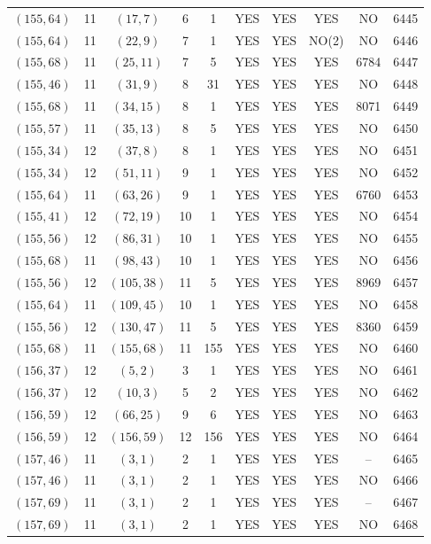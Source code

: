 \begin{longtable}{|c|c|c|c|c|c|c|c|c|c|}
$(155, 64)$ & 11 & $(17, 7)$ & 6 & 1 & YES & YES & YES & NO & 6445\\
$(155, 64)$ & 11 & $(22, 9)$ & 7 & 1 & YES & YES & NO(2) & NO & 6446\\
$(155, 68)$ & 11 & $(25, 11)$ & 7 & 5 & YES & YES & YES & 6784 & 6447\\
$(155, 46)$ & 11 & $(31, 9)$ & 8 & 31 & YES & YES & YES & NO & 6448\\
$(155, 68)$ & 11 & $(34, 15)$ & 8 & 1 & YES & YES & YES & 8071 & 6449\\
$(155, 57)$ & 11 & $(35, 13)$ & 8 & 5 & YES & YES & YES & NO & 6450\\
$(155, 34)$ & 12 & $(37, 8)$ & 8 & 1 & YES & YES & YES & NO & 6451\\
$(155, 34)$ & 12 & $(51, 11)$ & 9 & 1 & YES & YES & YES & NO & 6452\\
$(155, 64)$ & 11 & $(63, 26)$ & 9 & 1 & YES & YES & YES & 6760 & 6453\\
$(155, 41)$ & 12 & $(72, 19)$ & 10 & 1 & YES & YES & YES & NO & 6454\\
$(155, 56)$ & 12 & $(86, 31)$ & 10 & 1 & YES & YES & YES & NO & 6455\\
$(155, 68)$ & 11 & $(98, 43)$ & 10 & 1 & YES & YES & YES & NO & 6456\\
$(155, 56)$ & 12 & $(105, 38)$ & 11 & 5 & YES & YES & YES & 8969 & 6457\\
$(155, 64)$ & 11 & $(109, 45)$ & 10 & 1 & YES & YES & YES & NO & 6458\\
$(155, 56)$ & 12 & $(130, 47)$ & 11 & 5 & YES & YES & YES & 8360 & 6459\\
$(155, 68)$ & 11 & $(155, 68)$ & 11 & 155 & YES & YES & YES & NO & 6460\\
$(156, 37)$ & 12 & $(5, 2)$ & 3 & 1 & YES & YES & YES & NO & 6461\\
$(156, 37)$ & 12 & $(10, 3)$ & 5 & 2 & YES & YES & YES & NO & 6462\\
$(156, 59)$ & 12 & $(66, 25)$ & 9 & 6 & YES & YES & YES & NO & 6463\\
$(156, 59)$ & 12 & $(156, 59)$ & 12 & 156 & YES & YES & YES & NO & 6464\\
$(157, 46)$ & 11 & $(3, 1)$ & 2 & 1 & YES & YES & YES & -- & 6465\\
$(157, 46)$ & 11 & $(3, 1)$ & 2 & 1 & YES & YES & YES & NO & 6466\\
$(157, 69)$ & 11 & $(3, 1)$ & 2 & 1 & YES & YES & YES & -- & 6467\\
$(157, 69)$ & 11 & $(3, 1)$ & 2 & 1 & YES & YES & YES & NO & 6468\\

\end{longtable}
